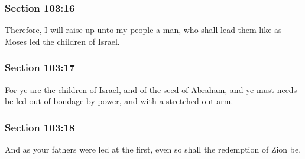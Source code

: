 	\subsubsection{Section 103:16} %
		\label{DC103-16}

		Therefore, I will raise up unto my people a man, who shall lead them like as Moses led the children of Israel.


	\subsubsection{Section 103:17} %
		\label{DC103-17}

		For ye are the children of Israel, and of the seed of Abraham, and ye must needs be led out of bondage by power, and with a stretched-out arm.


	\subsubsection{Section 103:18} %
		\label{DC103-18}

		And as your fathers were led at the first, even so shall the redemption of Zion be.


